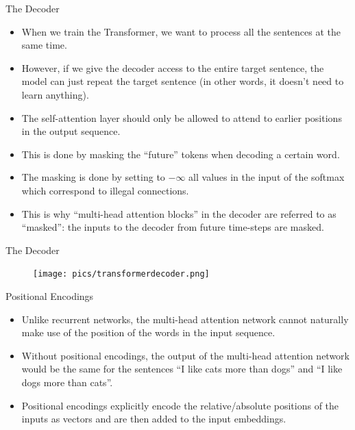\documentclass[handout]{beamer}
\begin{document}
\begin{frame}{The Decoder}
\begin{scriptsize}
\begin{itemize}
 \item When we train the Transformer, we want to process all the sentences at the same time. 
 
 \item However, if we give the decoder access to the entire target sentence, the model can just repeat the target sentence (in other words, it doesn't need to learn anything).
 
 \item The self-attention layer should only be allowed to attend to earlier positions in the output sequence.
 
 \item This is done by masking the ``future'' tokens when decoding a certain word.

  \item The masking is done by setting to $- \infty$ all values in the input of the softmax which correspond to illegal connections.
 \item This is why ``multi-head attention blocks'' in the decoder are referred to as ``masked'': the inputs to the decoder from future time-steps are masked.
 
 
\end{itemize}

\end{scriptsize}

\end{frame}


\begin{frame}{The Decoder}

     \begin{figure}[h]
        	\texttt{[image: pics/transformerdecoder.png]}
        \end{figure}  


\end{frame}



\begin{frame}{Positional Encodings}
\begin{scriptsize}
\begin{itemize}

 \item  Unlike recurrent networks, the multi-head attention network cannot naturally make use of the position of the words in the input sequence.
 
 \item Without positional encodings, the output of the multi-head attention network would be the same for the sentences ``I like cats more than dogs'' and ``I like dogs more than cats''.
 
 \item Positional encodings explicitly encode the relative/absolute positions of the inputs as vectors and are then added to the input embeddings.

\end{itemize}

\end{scriptsize}


\end{frame}
\end{document}
